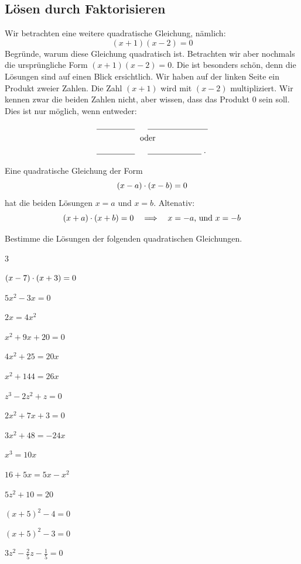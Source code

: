 \documentclass[11pt,oneside]{article}
\begin{document}
\subsection{Lösen durch Faktorisieren}
	Wir betrachten eine weitere quadratische Gleichung, nämlich:
	\begin{equation*}
		(x+1)(x-2)=0
	\end{equation*}
	Begründe, warum diese Gleichung quadratisch ist.\vspace{5pt}\newline{}
	Betrachten wir aber nochmals die ursprüngliche Form $(x+1)(x-2)=0$. Die ist besonders schön, denn die Lösungen sind auf einen Blick ersichtlich. Wir haben auf der linken Seite ein Produkt zweier Zahlen. Die Zahl $(x+1)$ wird mit $(x-2)$ multipliziert. Wir kennen zwar die beiden Zahlen nicht, aber wissen, dass das Produkt $0$ sein soll. Dies ist nur möglich, wenn entweder:
	\begin{align*}
		\lineortext{x+1=0}&\quad\lineortext{\quad\text{, also } x=-1}\\
		& \text{ oder }\\
		\lineortext{x-2=0}&\quad\lineortext{\quad\text{, also } x=2}.
	\end{align*}
	\begin{satz}
		Eine quadratische Gleichung der Form
		\[(x-a)\cdot(x-b)=0\]
		hat die beiden Lösungen $x=a$ und $x=b$.\newline
		Altenativ: \[(x+a)\cdot(x+b)=0 \quad\Longrightarrow\quad x=-a \text{, und } x=-b\]
	\end{satz}
	\begin{aufgabe}
		Bestimme die Lösungen der folgenden quadratischen Gleichungen.
		\begin{enumerate}[label=\alph*)]\end{enumerate}
	\end{aufgabe}
\end{document}
